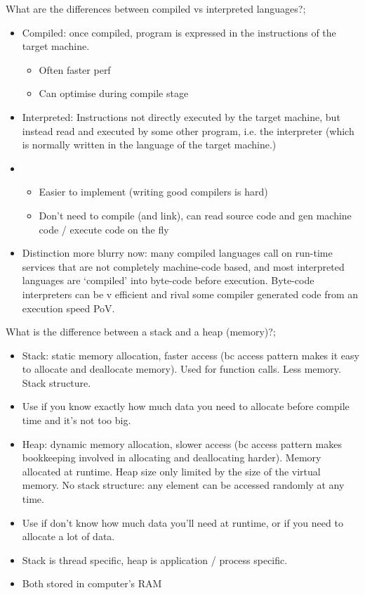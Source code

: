 \documentclass{article}
\begin{document}
What are the differences between compiled vs interpreted languages?;\begin{itemize} \item Compiled: once compiled, program is expressed in the instructions of the target machine.  \begin{itemize} \item Often faster perf \item Can optimise during compile stage \end{itemize} \item Interpreted: Instructions not directly executed by the target machine, but instead read and executed by some other program, i.e. the interpreter (which is normally written in the language of the target machine.) \item \begin{itemize} \item Easier to implement (writing good compilers is hard) \item Don't need to compile (and link), can read source code and gen machine code / execute code on the fly \end{itemize} \item Distinction more blurry now: many compiled languages call on run-time services that are not completely machine-code based, and most interpreted languages are `compiled' into byte-code before execution. Byte-code interpreters can be v efficient and rival some compiler generated code from an execution speed PoV.  \end{itemize}

What is the difference between a stack and a heap (memory)?; \begin{itemize} \item Stack: static memory allocation, faster access (bc access pattern makes it easy to allocate and deallocate memory). Used for function calls. Less memory. Stack structure. \item Use if you know exactly how much data you need to allocate before compile time and it's not too big. \item Heap: dynamic memory allocation, slower access (bc access pattern makes bookkeeping involved in allocating and deallocating harder). Memory allocated at runtime. Heap size only limited by the size of the virtual memory. No stack structure: any element can be accessed randomly at any time. \item Use if don't know how much data you'll need at runtime, or if you need to allocate a lot of data. \item Stack is thread specific, heap is application / process specific. \item Both stored in computer's RAM \end{itemize}
\end{document}
